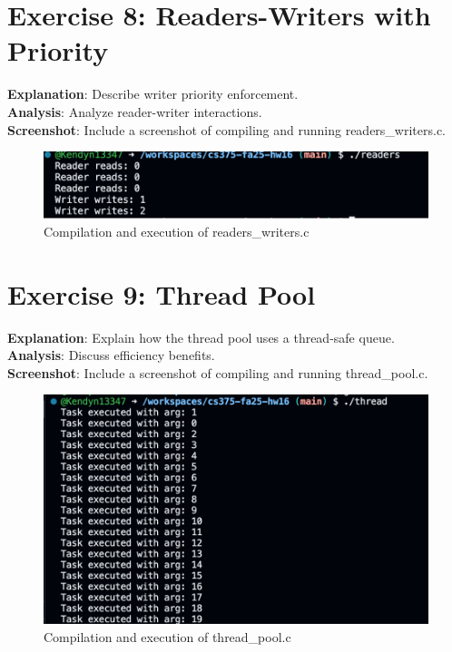\documentclass{article}
\begin{document}
\section{Exercise 8: Readers-Writers with Priority}

\textbf{Explanation}: Describe writer priority enforcement.\\
\textbf{Analysis}: Analyze reader-writer interactions.\\
\textbf{Screenshot}: Include a screenshot of compiling and running readers\_writers.c.
\begin{figure}[H]
    \centering
    \includegraphics[width=\textwidth]{readers.png}
    \caption{Compilation and execution of readers\_writers.c}
\end{figure}

\section{Exercise 9: Thread Pool}

\textbf{Explanation}: Explain how the thread pool uses a thread-safe queue.\\
\textbf{Analysis}: Discuss efficiency benefits.\\
\textbf{Screenshot}: Include a screenshot of compiling and running thread\_pool.c.
\begin{figure}[H]
    \centering
    \includegraphics[width=\textwidth]{thread_pool.png}
    \caption{Compilation and execution of thread\_pool.c}
\end{figure}
\end{document}
